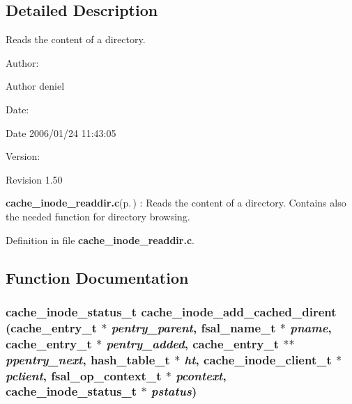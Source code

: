 \subsection{Detailed Description}
Reads the content of a directory. 

\begin{Desc}
\item[Author:]\begin{Desc}
\item[Author]deniel \end{Desc}
\end{Desc}
\begin{Desc}
\item[Date:]\begin{Desc}
\item[Date]2006/01/24 11:43:05 \end{Desc}
\end{Desc}
\begin{Desc}
\item[Version:]\begin{Desc}
\item[Revision]1.50 \end{Desc}
\end{Desc}
{\bf cache\_\-inode\_\-readdir.c}{\rm (p.\,\pageref{cache__inode__readdir_8c})} : Reads the content of a directory. Contains also the needed function for directory browsing.

Definition in file {\bf cache\_\-inode\_\-readdir.c}.

\subsection{Function Documentation}
\subsubsection{\setlength{\rightskip}{0pt plus 5cm}cache\_\-inode\_\-status\_\-t cache\_\-inode\_\-add\_\-cached\_\-dirent (cache\_\-entry\_\-t $\ast$ {\em pentry\_\-parent}, fsal\_\-name\_\-t $\ast$ {\em pname}, cache\_\-entry\_\-t $\ast$ {\em pentry\_\-added}, cache\_\-entry\_\-t $\ast$$\ast$ {\em ppentry\_\-next}, hash\_\-table\_\-t $\ast$ {\em ht}, cache\_\-inode\_\-client\_\-t $\ast$ {\em pclient}, fsal\_\-op\_\-context\_\-t $\ast$ {\em pcontext}, cache\_\-inode\_\-status\_\-t $\ast$ {\em pstatus})}\label{cache__inode__readdir_8c_a1}


